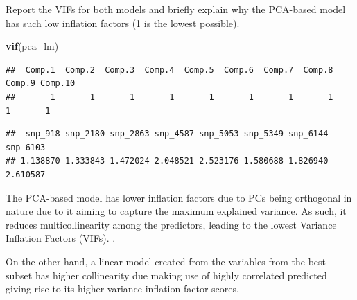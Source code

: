 \documentclass[
]{article}
\newenvironment{Shaded}{\begin{snugshade}}{\end{snugshade}}
\newcommand{\AttributeTok}[1]{\textcolor[rgb]{0.13,0.29,0.53}{#1}}
\newcommand{\FunctionTok}[1]{\textcolor[rgb]{0.13,0.29,0.53}{\textbf{#1}}}
\newcommand{\NormalTok}[1]{#1}
\newcommand{\OtherTok}[1]{\textcolor[rgb]{0.56,0.35,0.01}{#1}}
\newcommand{\SpecialCharTok}[1]{\textcolor[rgb]{0.81,0.36,0.00}{\textbf{#1}}}
\newcommand{\StringTok}[1]{\textcolor[rgb]{0.31,0.60,0.02}{#1}}
\begin{document}
Report the VIFs for both models and briefly explain why the PCA-based
model has such low inflation factors (1 is the lowest possible).

\begin{Shaded}
\begin{Highlighting}[]
\FunctionTok{vif}\NormalTok{(pca\_lm)}
\end{Highlighting}
\end{Shaded}

\begin{verbatim}
##  Comp.1  Comp.2  Comp.3  Comp.4  Comp.5  Comp.6  Comp.7  Comp.8  Comp.9 Comp.10 
##       1       1       1       1       1       1       1       1       1       1
\end{verbatim}

\begin{Shaded}
\end{Shaded}

\begin{verbatim}
##  snp_918 snp_2180 snp_2863 snp_4587 snp_5053 snp_5349 snp_6144 snp_6103 
## 1.138870 1.333843 1.472024 2.048521 2.523176 1.580688 1.826940 2.610587
\end{verbatim}

The PCA-based model has lower inflation factors due to PCs being
orthogonal in nature due to it aiming to capture the maximum explained
variance. As such, it reduces multicollinearity among the predictors,
leading to the lowest Variance Inflation Factors (VIFs). .

On the other hand, a linear model created from the variables from the
best subset has higher collinearity due making use of highly correlated
predicted giving rise to its higher variance inflation factor scores.
\end{document}
